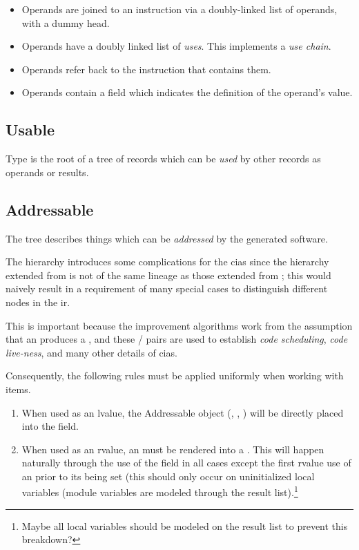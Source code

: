 \begin{itemize}
\item Operands are joined to an instruction via a doubly-linked list of
  operands, with a dummy head.
\item Operands have a doubly linked list of \emph{uses}.  This
  implements a \emph{use chain}.

\item Operands refer back to the instruction that contains them.
  
\item Operands contain a field which indicates the definition of the
  operand's value.
\end{itemize}

\subsection{Usable}

Type  is the root of a tree of records which can be
\emph{used} by other records as operands or results.

\subsection{Addressable}

The  tree describes things which can be
\emph{addressed} by the generated software.

The  hierarchy introduces some complications for the
\acp{cia} since the hierarchy extended from  is not
of the same lineage as those extended from ; this would
naively result in a requirement of many special cases to distinguish
different nodes in the \ac{ir}.

This is important because the improvement algorithms work from the
assumption that an  produces a , and
these / pairs are used to establish
\emph{code scheduling}, \emph{code live-ness}, and many other
details of \acp{cia}.

Consequently, the following rules must be applied uniformly when
working with  items.

\begin{enumerate}
\item When used as an lvalue, the Addressable object (,
  , ) will be directly placed into the
   field.
  
\item When used as an rvalue, an  must be rendered
  into a .  This will happen naturally through the use of
  the  field in all cases except the first
  rvalue use of an  prior to its being set (this
  should only occur on uninitialized local variables (module variables
  are modeled through the  result
  list).\footnote{Maybe all local variables should be modeled on the
     result list to prevent this breakdown?}
\end{enumerate}

